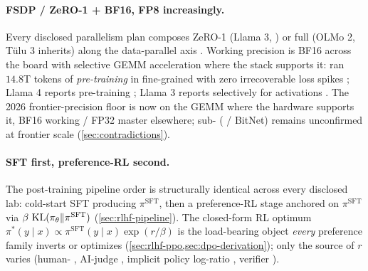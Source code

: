 \paragraph{FSDP / ZeRO-1 + BF16, FP8 increasingly.}
Every disclosed parallelism plan composes ZeRO-1 (Llama 3, )
or full  (OLMo 2, Tülu 3 inherits) along the data-parallel axis
\citep[\S 2.1.2]{torchtitan2024}. Working precision is BF16 across
the board with selective  GEMM acceleration where the stack
supports it:  ran $14.8$T tokens of \emph{pre-training}
in fine-grained  with zero irrecoverable loss spikes
\citep[abstract]{deepseek-v3}; Llama 4 reports  pre-training
\citep{meta-llama4}; Llama 3 reports  selectively for activations
\citep{meta-llama3}. The 2026 frontier-precision floor is now  on
the GEMM where the hardware supports it, BF16 working / FP32 master
elsewhere; sub- ( / BitNet) remains unconfirmed at frontier
scale (\cref{sec:contradictions}).

\paragraph{SFT first, preference-RL second.}
The post-training pipeline order is structurally identical across
every disclosed lab: cold-start SFT \citep{ouyang2022-instructgpt}
producing $\pi^{\mathrm{SFT}}$, then a preference-RL stage anchored
on $\pi^{\mathrm{SFT}}$ via $\beta\,\operatorname{KL}(\pi_\theta \| \pi^{\mathrm{SFT}})$
(\cref{sec:rlhf-pipeline}). The closed-form RL optimum
$\pi^*(y \mid x) \propto \pi^{\mathrm{SFT}}(y \mid x) \exp(r / \beta)$
is the load-bearing object \emph{every} preference family inverts or
optimizes (\cref{sec:rlhf-ppo,sec:dpo-derivation}); only the source
of $r$ varies (human- \citep{ouyang2022-instructgpt}, AI-judge
\citep{bai2022-cai}, implicit policy log-ratio \citep{rafailov2023-dpo},
verifier \citep{shao2024}).

